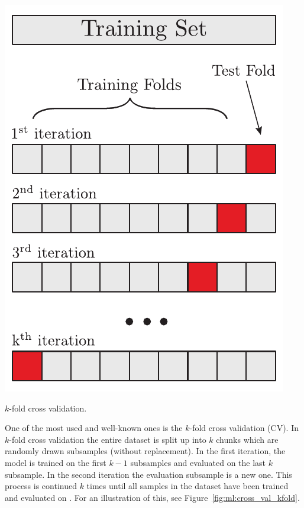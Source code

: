 \begin{marginfigure}[1cm]
  \includegraphics[width=\textwidth, trim=5 5 5 5, clip]{figures/cross_validation/kfold.pdf}
  \caption[$k$-Fold Cross Validation]
    {$k$-fold cross validation. 
    }
  \label{fig:ml:cross_val_kfold}
\end{marginfigure} 

One of the most used and well-known ones is the $k$-fold cross validation (CV). In $k$-fold cross validation the entire dataset is split up into $k$ chunks which are randomly drawn subsamples (without replacement). In the first iteration, the model is trained on the first $k-1$ subsamples and evaluated on the last $k$ subsample. In the second iteration the evaluation subsample is a new one. This process is continued $k$ times until all samples in the dataset have been trained and evaluated on \citep{hastieElementsStatisticalLearning2009}. For an illustration of this, see Figure~\ref{fig:ml:cross_val_kfold}. 


